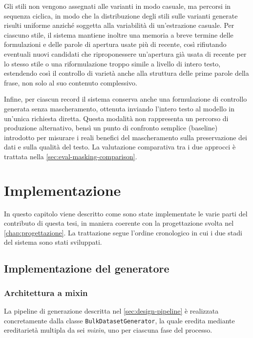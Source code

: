 \documentclass[12pt,a4paper,openright,twoside]{book}
\begin{document}
Gli stili non vengono assegnati alle varianti in modo casuale, ma percorsi in
sequenza ciclica, in modo che la distribuzione degli stili sulle varianti
generate risulti uniforme anziché soggetta alla variabilità di un'estrazione
casuale. Per ciascuno stile, il sistema mantiene inoltre una memoria a breve
termine delle formulazioni e delle parole di apertura usate più di recente, così
rifiutando eventuali nuovi candidati che riproponessere un'apertura già usata di
recente per lo stesso stile o una riformulazione troppo simile a livello di
intero testo, estendendo così il controllo di varietà anche alla struttura delle
prime parole della frase, non solo al suo contenuto complessivo.

Infine, per ciascun record il sistema conserva anche una formulazione di
controllo generata senza mascheramento, ottenuta inviando l'intero testo al
modello in un'unica richiesta diretta. Questa modalità non rappresenta un
percorso di produzione alternativo, bensì un punto di confronto semplice
(baseline) introdotto per misurare i reali benefici del mascheramento sulla
preservazione dei dati e sulla qualità del testo. La valutazione comparativa tra
i due approcci è trattata nella \cref{sec:eval-masking-comparison}.


\chapter{Implementazione}
\label{chap:implementation}

In questo capitolo viene descritto come sono state implementate le varie parti
del contributo di questa tesi, in maniera coerente con la progettazione svolta
nel \cref{chap:progettazione}. La trattazione segue l'ordine cronologico in cui
i due stadi del sistema sono stati sviluppati.

\section{Implementazione del generatore}
\label{sec:impl-generator}

\subsection{Architettura a mixin}
\label{sec:impl-mixin}

La pipeline di generazione descritta nel \cref{sec:design-pipeline} è realizzata
concretamente dalla classe \texttt{BulkDatasetGenerator}, la quale eredita
mediante ereditarietà multipla da sei \emph{mixin}, uno per ciascuna fase del
processo.
\end{document}
